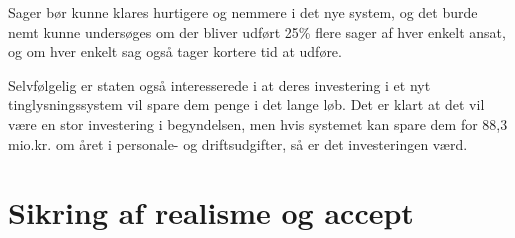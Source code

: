 \documentclass[10pt,a4paper,danish]{article}
\begin{document}
Sager bør kunne klares hurtigere og nemmere i det nye system, og det burde nemt kunne undersøges om der bliver udført 25\% flere sager af hver enkelt ansat, og om hver enkelt sag også tager kortere tid at udføre.

Selvfølgelig er staten også interesserede i at deres investering i et nyt tinglysningssystem vil spare dem penge i det lange løb. Det er klart at det vil være en stor investering i begyndelsen, men hvis systemet kan spare dem for 88,3 mio.kr. om året i personale- og driftsudgifter, så er det investeringen værd.


\section{Sikring af realisme og accept}
\end{document}
